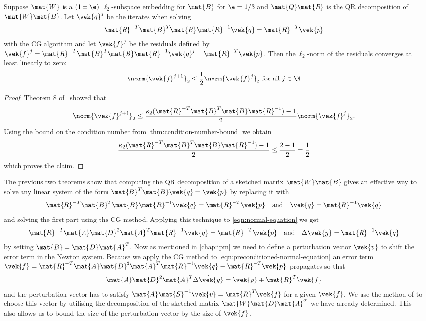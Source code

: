 \begin{lemma}\label{thm:cg-residual-bound}
Suppose \(\mat{W}\) is a \((1\pm\e)\) \(\ell_2\)-subspace embedding for \(\mat{B}\) for \(\e = 1/3\) and \(\mat{Q}\mat{R}\) is the QR decomposition of \(\mat{W}\mat{B}\).
Let \(\vek{q}^j\) be the iterates when solving \[ \mat{R}^{-T} \mat{B}^T \mat{B} \mat{R}^{-1} \vek{q} = \mat{R}^{-T} \vek{p} \] with the CG algorithm and let \(\vek{f}^j\) be the residuals defined by
\( \vek{f}^j = \mat{R}^{-T} \mat{B}^T \mat{B} \mat{R}^{-1} \vek{q}^j - \mat{R}^{-T} \vek{p} \).
Then the \(\ell_2\)-norm of the residuals converges at least linearly to zero:
\[ \norm{\vek{f}^{j+1}}_2 \leq \frac{1}{2} \norm{ \vek{f}^j }_2 \text{ for all } j \in \N \]
\end{lemma}
\begin{proof}
Theorem 8 of~\cite{Bouyouli-ConjugateGradientConvergence} showed that
\[ \norm{\vek{f}^{j+1}}_2 \leq \frac{\kappa_2(\mat{R}^{-T} \mat{B}^T \mat{B} \mat{R}^{-1}) - 1}{2} \norm{\vek{f}^j}_2 .\]
Using the bound on the condition number from \cref{thm:condition-number-bound} we obtain
\[ \frac{\kappa_2(\mat{R}^{-T} \mat{B}^T \mat{B} \mat{R}^{-1}) - 1}{2}
   \leq \frac{2 - 1}{2} = \frac{1}{2} \]
which proves the claim.
\end{proof}

The previous two theorems show that computing the QR decomposition of a sketched matrix \(\mat{W}\mat{B}\) gives an effective way to solve any linear system of the form
\( \mat{B}^T \mat{B}\tilde{\vek{q}} = \vek{p} \)
by replacing it with
\begin{equation}\label{eqn:general-preconditioned-linear-system}
  \mat{R}^{-T}\mat{B}^T\mat{B}\mat{R}^{-1}\vek{q} = \mat{R}^{-T}\vek{p} \quad \text{and} \quad \tilde{\vek{q}} = \mat{R}^{-1}\vek{q}
\end{equation}
and solving the first part using the CG method.
Applying this technique to \cref{eqn:normal-equation} we get
\begin{equation}\label{eqn:preconditioned-normal-equation}
  \mat{R}^{-T}\mat{A}\mat{D}^2\mat{A}^T\mat{R}^{-1}\vek{q} = \mat{R}^{-T}\vek{p} \quad \text{and} \quad \Delta\vek{y} = \mat{R}^{-1}\vek{q}
\end{equation}
by setting \(\mat{B} = \mat{D}\mat{A}^T\).
Now as mentioned in \cref{chap:ipm} we need to define a perturbation vector \(\vek{v}\) to shift the error term in the Newton system.
Because we apply the CG method to \cref{eqn:preconditioned-normal-equation} an error term \(\vek{f} = \mat{R}^{-T}\mat{A}\mat{D}^2\mat{A}^T\mat{R}^{-1}\vek{q} - \mat{R}^{-T}\vek{p}\) propagates so that
\begin{equation}
  \mat{A} \mat{D}^2 \mat{A}^T \hat{\Delta\vek{y}} = \vek{p} + \mat{R}^T\vek{f}
\end{equation}
and the perturbation vector has to satisfy \(\mat{A}\mat{S}^{-1}\vek{v} = \mat{R}^T \vek{f}\) for a given \(\vek{f}\).
We use the method of \textcite{Avron-FasterRandomizedInfeasibleIPMs} to choose this vector by utilising the decomposition of the sketched matrix \(\mat{W}\mat{D}\mat{A}^T\) we have already determined.
This also allows us to bound the size of the perturbation vector by the size of \(\vek{f}\).

